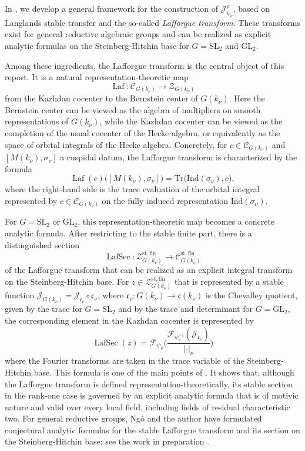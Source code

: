 \documentclass[iccmp]{ipbook}
\newcommand{\CC}{{\mathcal {C}}}
\newcommand{\CF}{{\mathcal {F}}}
\newcommand{\CJ}{{\mathcal {J}}}
\newcommand{\CZ}{{\mathcal {Z}}}
\newcommand{\Fc}{{\mathfrak {c}}}
\newcommand{\GL}{{\mathrm{GL}}}
\newcommand{\Ind}{{\mathrm{Ind}}}
\newcommand{\SL}{{\mathrm{SL}}}
\newcommand{\st}{{\mathrm{st}}}
\def\sig{{\sigma}}
\newcommand{\Laf}{\operatorname{Laf}}
\newcommand{\LafSec}{\operatorname{LafSec}}
\newcommand{\fin}{\mathrm{fin}}
\def\Tr{\mathrm{Tr}}
\begin{document}
In \cite{LN}, we develop a general framework for the construction of
$\CJ^\rho_{\psi_\nu}$, based on Langlands stable transfer \cite{MR3117742} and the 
so-called \emph{Lafforgue transform}. These transforms exist for general reductive algebraic groups and can be realized as explicit analytic formulas
on the Steinberg-Hitchin base for $G=\SL_2$ and $\GL_2$.

Among these ingredients, the Lafforgue transform is the central object of this report. It is a 
natural representation-theoretic map 
\begin{equation}\label{eq:intro:Laf}
\Laf:\CC_{G(k_\nu)}\longrightarrow \CZ_{G(k_\nu)}
\end{equation}
from the Kazhdan cocenter to the Bernstein center of $G(k_\nu)$. Here the Bernstein center 
can be viewed as the algebra of multipliers on smooth representations of $G(k_\nu)$, while 
the Kazhdan cocenter can be viewed as the completion of the usual cocenter of the Hecke algebra, or
equivalently as the space of orbital integrals of the Hecke algebra. Concretely, for $c\in \CC_{G(k_\nu)}$ and
$[M(k_\nu),\sig_\nu]$ a cuspidal datum, the Lafforgue transform is characterized by the 
formula 
\begin{equation}\label{eq:intro:Laf-spectral}
\Laf(c)\big([M(k_\nu),\sigma_\nu]\big)=
\Tr\big(\Ind(\sig_\nu),c\big),
\end{equation}
where the right-hand side is the trace evaluation of the orbital integral represented by $c\in \CC_{G(k_\nu)}$
on the fully induced representation $\Ind(\sig_\nu)$.

For $G=\SL_2$ or $\GL_2$, this representation-theoretic map becomes a concrete 
analytic formula. After restricting to the stable finite part, there is a 
distinguished section 
$$
\LafSec:\CZ_{G(k_\nu)}^{\st,\fin}\to \CC_{G(k_\nu)}^{\st,\fin}
$$
of the Lafforgue transform that can be realized as an explicit integral transform 
on the Steinberg-Hitchin base. For $z\in \CZ^{\st,\fin}_{G(k_\nu)}$ that is represented
by a stable function $\CJ_{G(k_\nu)} = \CJ_{\Fc_\nu}\circ \Fc_\nu$, where $\Fc_\nu:G(k_\nu)\to \Fc(k_\nu)$
is the Chevalley quotient, given by the trace for $G=\SL_2$ and by the trace and determinant for $G=\GL_2$,
the corresponding element in the Kazhdan cocenter is represented by
$$
\LafSec(z) = 
\CF_{\psi_\nu}\bigg(
\frac{\CF_{\psi^{-1}_\nu}(\CJ_{\Fc_\nu})}{|\cdot|_\nu}  
\bigg)
$$
where the Fourier transforms are taken in the trace variable of the Steinberg-Hitchin base. 
This formula is one of the main points of \cite{LN}. It shows that, although the
Lafforgue transform is defined representation-theoretically, its stable section in the rank-one
case is governed by an explicit analytic formula that is of motivic nature and valid
over every local field, including fields of residual characteristic two. For general reductive groups,
Ng\^o and the author have formulated conjectural analytic formulas for the stable
Lafforgue transform and its section on the Steinberg-Hitchin base; see the work in
preparation \cite{NL-general}.
\end{document}
